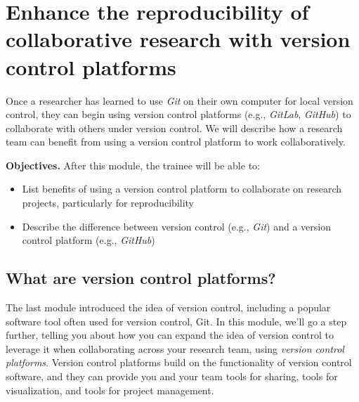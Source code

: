 \documentclass[]{tufte-book}
\providecommand{\tightlist}{%
  \setlength{\itemsep}{0pt}\setlength{\parskip}{0pt}}
\begin{document}
\section{Enhance the reproducibility of collaborative research with version control platforms}\label{module10}

Once a researcher has learned to use \emph{Git} on their own computer for
local version control, they can begin using version control platforms (e.g.,
\emph{GitLab}, \emph{GitHub}) to collaborate with others under version
control. We will describe how a research team can benefit from using a version
control platform to work collaboratively.

\textbf{Objectives.} After this module, the trainee will be able to:

\begin{itemize}
\tightlist
\item
  List benefits of using a version control platform to collaborate
  on research projects, particularly for reproducibility
\item
  Describe the difference between version control (e.g., \emph{Git}) and
  a version control platform (e.g., \emph{GitHub})
\end{itemize}

\subsection{What are version control platforms?}\label{what-are-version-control-platforms}

The last module introduced the idea of version control, including a popular
software tool often used for version control, Git. In this module, we'll go a
step further, telling you about how you can expand the idea of version control
to leverage it when collaborating across your research team, using \emph{version
control platforms}. Version control platforms build on the functionality of
version control software, and they can provide you and your team tools
for sharing, tools for visualization, and tools for project management.
\end{document}
